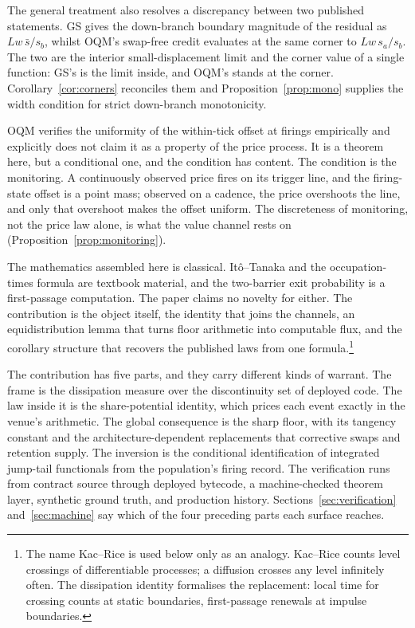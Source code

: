 \documentclass[11pt,a4paper]{article}
\theoremstyle{definition}
\theoremstyle{plain}
\theoremstyle{remark}
\begin{document}
The general treatment also resolves a discrepancy between two published statements. GS gives the down-branch boundary magnitude of the residual as $L w\, \bar s / s_b$, 
whilst OQM's swap-free credit evaluates at the same corner to $L w\, s_a / s_b$. The two are the interior small-displacement limit and the corner value of a single function:
GS's is the limit inside, and OQM's stands at the corner. Corollary~\ref{cor:corners} reconciles them and Proposition~\ref{prop:mono} supplies the width condition for strict
down-branch monotonicity.

OQM verifies the uniformity of the within-tick offset at firings empirically and explicitly does not claim it as a property of the price process. It is a theorem here, but a 
conditional one, and the condition has content. The condition is the monitoring. A continuously observed price fires on its trigger line, and the firing-state offset is 
a point mass; observed on a cadence, the price overshoots the line, and only that overshoot makes the offset uniform. The discreteness of monitoring, not the price law 
alone, is what the value channel rests on (Proposition~\ref{prop:monitoring}).

The mathematics assembled here is classical. It\^o--Tanaka and the occupation-times formula are textbook material,\cite{revuzyor} and the two-barrier exit probability 
is a first-passage computation.\cite{redner2001} The paper claims no novelty for either. The contribution is the object itself, the identity that joins the channels, an 
equidistribution lemma that turns floor arithmetic into computable flux, and the corollary structure that recovers the published laws from one formula.\footnote{The name Kac--Rice 
is used below only as an analogy. Kac--Rice counts level crossings of differentiable processes;\cite{azaiswschebor2009} a diffusion crosses any level infinitely often. 
The dissipation identity formalises the replacement: local time for crossing counts at static boundaries, first-passage renewals at impulse boundaries.}

The contribution has five parts, and they carry different kinds of warrant. The frame is the dissipation measure over the discontinuity set of deployed code. 
The law inside it is the share-potential identity, which prices each event exactly in the venue's arithmetic. The global consequence is the sharp floor, with its tangency 
constant and the architecture-dependent replacements that corrective swaps and retention supply. The inversion is the conditional identification of integrated jump-tail 
functionals from the population's firing record. The verification runs from contract source through deployed bytecode, a machine-checked theorem layer,
synthetic ground truth, and production history. Sections~\ref{sec:verification} and~\ref{sec:machine} say which of the four preceding parts each surface reaches.
\end{document}
